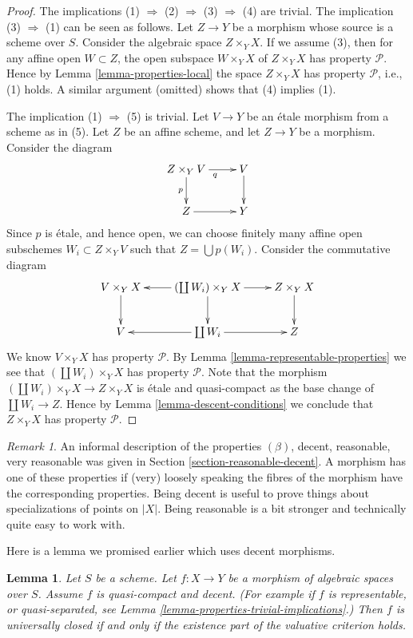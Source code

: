 \documentclass{stacks-project}
\theoremstyle{plain}
\newtheorem{lemma}[subsection]{Lemma}
\theoremstyle{definition}
\theoremstyle{remark}
\newtheorem{remark}[subsection]{Remark}
\numberwithin{equation}{subsection}
\begin{document}
\begin{proof}
The implications (1) $\Rightarrow$ (2) $\Rightarrow$ (3) $\Rightarrow$ (4)
are trivial.
The implication (3) $\Rightarrow$ (1) can be seen as follows.
Let $Z \to Y$ be a morphism whose source is a scheme over $S$.
Consider the algebraic space $Z \times_Y X$. If we assume (3), then
for any affine open $W \subset Z$, the open subspace
$W \times_Y X$ of $Z \times_Y X$ has property $\mathcal{P}$. Hence by
Lemma \ref{lemma-properties-local}
the space $Z \times_Y X$ has property $\mathcal{P}$, i.e., (1) holds.
A similar argument (omitted) shows that (4) implies (1).

\medskip\noindent
The implication (1) $\Rightarrow$ (5) is trivial. Let $V \to Y$ be
an \'etale morphism from a scheme as in (5). Let $Z$ be an affine scheme,
and let $Z \to Y$ be a morphism. Consider the diagram
$$
\xymatrix{
Z \times_Y V \ar[r]_q \ar[d]_p & V \ar[d] \\
Z \ar[r] & Y
}
$$
Since $p$ is \'etale, and hence open, we can choose finitely many affine open
subschemes $W_i \subset Z \times_Y V$ such that $Z = \bigcup p(W_i)$.
Consider the commutative diagram
$$
\xymatrix{
V \times_Y X \ar[d] &
(\coprod W_i) \times_Y X \ar[l] \ar[d] \ar[r] &
Z \times_Y X \ar[d] \\
V &
\coprod W_i \ar[l] \ar[r] &
Z
}
$$
We know $V \times_Y X$ has property $\mathcal{P}$. By
Lemma \ref{lemma-representable-properties}
we see that $(\coprod W_i) \times_Y X$ has property $\mathcal{P}$.
Note that the morphism $(\coprod W_i) \times_Y X \to Z \times_Y X$
is \'etale and quasi-compact as the base change of $\coprod W_i \to Z$.
Hence by Lemma \ref{lemma-descent-conditions}
we conclude that $Z \times_Y X$ has property $\mathcal{P}$.
\end{proof}

\begin{remark}
\label{remark-very-reasonable}
An informal description of the properties $(\beta)$, decent, reasonable,
very reasonable was given in Section \ref{section-reasonable-decent}.
A morphism has one of these properties if (very) loosely speaking the
fibres of the morphism have the corresponding properties.
Being decent is useful to prove things about specializations of
points on $|X|$. Being reasonable is a bit stronger and technically
quite easy to work with.
\end{remark}

\noindent
Here is a lemma we promised earlier which uses decent morphisms.

\begin{lemma}
\label{lemma-re-characterize-universally-closed}
Let $S$ be a scheme.
Let $f : X \to Y$ be a morphism of algebraic spaces over $S$.
Assume $f$ is quasi-compact and decent.
(For example if $f$ is representable, or quasi-separated, see
Lemma \ref{lemma-properties-trivial-implications}.)
Then $f$ is universally closed if and only if the
existence part of the valuative criterion holds.
\end{lemma}
\end{document}
